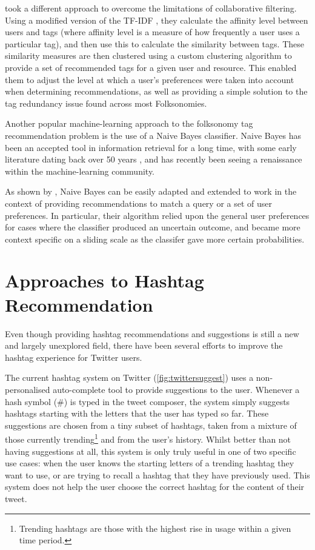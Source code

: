 \documentclass[11pt,a4paper]{report}
\begin{document}
\textcite{Niwa:2006} took a different approach to overcome the limitations of collaborative filtering. Using a modified version of the TF-IDF \parencite{Salton:1988}, they calculate the affinity level between users and tags (where affinity level is a measure of how frequently a user uses a particular tag), and then use this to calculate the similarity between tags. These similarity measures are then clustered using a custom clustering algorithm to provide a set of recommended tags for a given user and resource. This enabled them to adjust the level at which a user's preferences were taken into account when determining recommendations, as well as providing a simple solution to the tag redundancy issue found across most Folksonomies.

Another popular machine-learning approach to the folksonomy tag recommendation problem is the use of a Naive Bayes classifier. Naive Bayes has been an accepted tool in information retrieval for a long time, with some early literature dating back over 50 years \parencite{Maron:1960}, and has recently been seeing a renaissance within the machine-learning community.

As shown by \textcite{DePessemier:2010}, Naive Bayes can be easily adapted and extended to work in the context of providing recommendations to match a query or a set of user preferences. In particular, their algorithm relied upon the general user preferences for cases where the classifier produced an uncertain outcome, and became more context specific on a sliding scale as the classifer gave more certain probabilities.

\section{Approaches to Hashtag Recommendation}
Even though providing hashtag recommendations and suggestions is still a new and largely unexplored field, there have been several efforts to improve the hashtag experience for Twitter users.

The current hashtag system on Twitter (\autoref{fig:twittersuggest}) uses a non-personalised auto-complete tool to provide suggestions to the user. Whenever a hash symbol (\#) is typed in the tweet composer, the system simply suggests hashtags starting with the letters that the user has typed so far. These suggestions are chosen from a tiny subset of hashtags, taken from a mixture of those currently trending\footnote{Trending hashtags are those with the highest rise in usage within a given time period.} and from the user's history. Whilst better than not having suggestions at all, this system is only truly useful in one of two specific use cases: when the user knows the starting letters of a trending hashtag they want to use, or are trying to recall a hashtag that they have previously used. This system does not help the user choose the correct hashtag for the content of their tweet.
\end{document}
